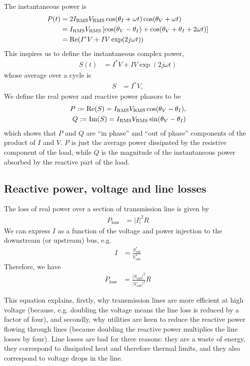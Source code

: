 \documentclass[11pt]{article}
\newcommand{\re}[1]{\ensuremath{\operatorname{Re}(#1)}}
\newcommand{\im}[1]{\ensuremath{\operatorname{Im}(#1)}}
\begin{document}
The instantaneous power is
\begin{align}
	P(t) &= 2I_\text{RMS}V_\text{RMS}\cos(\theta_I + \omega t)\cos(\theta_V + \omega t) \notag \\
	     &= I_\text{RMS}V_\text{RMS}\left[\cos(\theta_V - \theta_I) + \cos(\theta_V + \theta_I + 2 \omega t)\right] \notag \\
		 &= \re{I^*V + IV\exp(2j \omega t)}
\end{align}
This inspires us to define the instantaneous complex power,
\begin{align}
	S(t) &= I^*V + IV\exp(2j \omega t)
\end{align}
whose average over a cycle is
\begin{align}
	S &= I^*V,
\end{align}
We define the real power and reactive power phasors to be 
\begin{align}
	P := \re{S} = I_\text{RMS}V_\text{RMS}\cos(\theta_V - \theta_I), \notag \\
	Q := \im{S} = I_\text{RMS}V_\text{RMS}\sin(\theta_V - \theta_I)
\end{align}
which shows that $P$ and $Q$ are ``in phase'' and ``out of phase'' components of the product of $I$ and $V$. $P$ is just the average power dissipated by the resistive component of the load, while $Q$ is the magnitude of the instantaneous power absorbed by the reactive part of the load.

\subsection{Reactive power, voltage and line losses}
The loss of real power over a section of transmission line is given by
\begin{align}
	P_\text{loss} &= \left|I\right|^2 R
\end{align}
We can express $I$ as a function of the voltage and power injection to the downstream (or upstream) bus, e.g.
\begin{align}
	I &= \frac{S^*_\text{out}}{V^*_\text{out}}
\end{align}
Therefore, we have
\begin{align}
	P_\text{loss} &= \frac{\left|S_\text{out}\right|^2}{\left|V_\text{out}\right|^2}R
\end{align}

This equation explains, firstly, why transmission lines are more efficient at high voltage (because, e.g. doubling the voltage means the line loss is reduced by a factor of four), and secondly, why utilities are keen to reduce the reactive power flowing through lines (because doubling the reactive power multiplies the line losses by four). Line losses are bad for three reasons: they are a waste of energy, they correspond to dissipated heat and therefore thermal limits, and they also correspond to voltage drops in the line.
\end{document}
